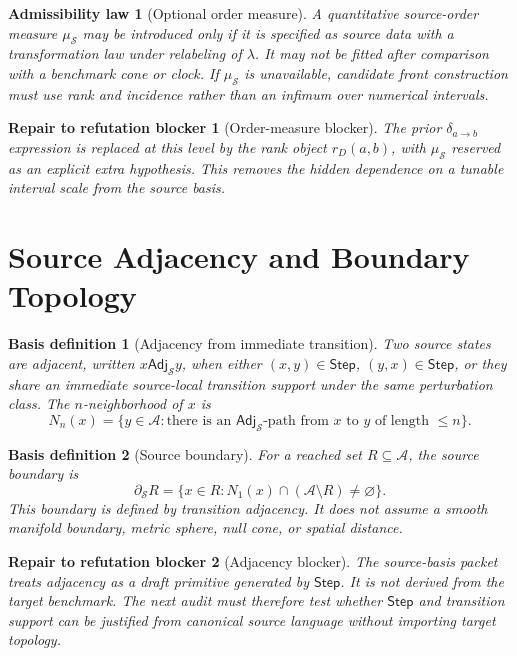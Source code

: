 \documentclass[11pt]{article}
\newcommand{\Sub}{\mathcal{A}}
\newcommand{\Step}{\mathsf{Step}}
\newcommand{\Adj}{\mathsf{Adj}_{\mathcal{S}}}
\newtheorem{basisdefinition}{Basis definition}
\newtheorem{admissibility}{Admissibility law}
\newtheorem{repair}{Repair to refutation blocker}
\begin{document}
\begin{admissibility}[Optional order measure]
A quantitative source-order measure \(\mu_{\mathcal{S}}\) may be introduced
only if it is specified as source data with a transformation law under
relabeling of \(\lambda\). It may not be fitted after comparison with a
benchmark cone or clock. If \(\mu_{\mathcal{S}}\) is unavailable, candidate
front construction must use rank and incidence rather than an infimum over
numerical intervals.
\end{admissibility}

\begin{repair}[Order-measure blocker]
The prior \(\delta_{a\to b}\) expression is replaced at this level by the
rank object \(r_D(a,b)\), with \(\mu_{\mathcal{S}}\) reserved as an explicit
extra hypothesis. This removes the hidden dependence on a tunable interval
scale from the source basis.
\end{repair}

\section{Source Adjacency and Boundary Topology}

\begin{basisdefinition}[Adjacency from immediate transition]
Two source states are adjacent, written \(x\Adj y\), when either
\((x,y)\in\Step\), \((y,x)\in\Step\), or they share an immediate source-local
transition support under the same perturbation class. The \(n\)-neighborhood
of \(x\) is
\[
N_n(x)=\{y\in\Sub: \text{there is an }\Adj\text{-path from }x
\text{ to }y\text{ of length }\le n\}.
\]
\end{basisdefinition}

\begin{basisdefinition}[Source boundary]
For a reached set \(R\subseteq\Sub\), the source boundary is
\[
\partial_{\mathcal{S}} R
=
\{x\in R: N_1(x)\cap(\Sub\setminus R)\neq\varnothing\}.
\]
This boundary is defined by transition adjacency. It does not assume a smooth
manifold boundary, metric sphere, null cone, or spatial distance.
\end{basisdefinition}

\begin{repair}[Adjacency blocker]
The source-basis packet treats adjacency as a draft primitive generated by
\(\Step\). It is not derived from the target benchmark. The next audit must
therefore test whether \(\Step\) and transition support can be justified from
canonical source language without importing target topology.
\end{repair}
\end{document}
